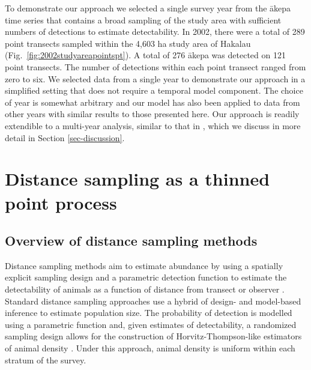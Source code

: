 \documentclass{statsoc}
\newcommand{\akepa}{\textquotesingle\={a}kepa}  %
\begin{document}
To demonstrate our approach we selected a single survey year from the \akepa{} time series that contains a broad sampling of the study area with sufficient numbers of detections to estimate detectability. In 2002, there were a total of 289 point transects sampled within the 4,603 ha study area of Hakalau (Fig.\ \ref{fig:2002studyareapointspt}).  A total of 276 \akepa{} was detected on 121 point transects. The number of detections within each point transect ranged from zero to six. We selected data from a single year to demonstrate our approach in a simplified setting that does not require a temporal model component.  The choice of year is somewhat arbitrary and our model has also been applied to data from other years with similar results to those presented here.  Our approach is readily extendible to a multi-year analysis, similar to that in \cite{camp_dsm_2020}, which we discuss in more detail in Section \ref{sec-discussion}.

\section{Distance sampling as a thinned point process}
\label{sec-ds-pp}

\subsection{Overview of distance sampling methods}

Distance sampling methods aim to estimate abundance by using a spatially explicit sampling design and a parametric detection function to estimate the detectability of animals as a function of distance from transect or observer \citep{buckland_distance_2015}.  Standard distance sampling approaches use a hybrid of design- and model-based inference to estimate population size.  The probability of detection is modelled using a parametric function and, given estimates of detectability, a randomized sampling design allows for the construction of Horvitz-Thompson-like estimators of animal density \citep{ buckland_advanced_2004, horvitz_generalization_1952}.  Under this approach, animal density is uniform within each stratum of the survey.
\end{document}
